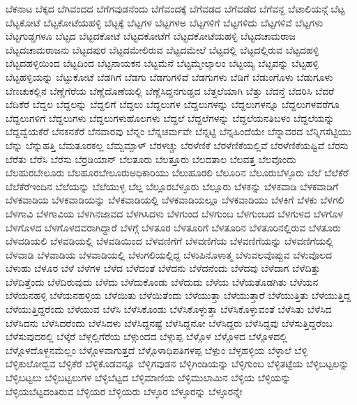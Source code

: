 {ಬೆಕನಾಟ
ಬೆಕ್ಕದ
ಬೆಗಿವಂದದ
ಬೆಗೆಗವುಡನೆಂದು
ಬೆಗೆವಂದಕ್ಕೆ
ಬೆಗೆವಡದ
ಬೆಗೆವಡೆದ
ಬೆಗೆವನ್ದ
ಬೆಟಾಲಿಯನ್ಗೆ
ಬೆಟ್ಟ
ಬೆಟ್ಟಕೋಟೆ
ಬೆಟ್ಟಕೋಟೆಯಹಳ್ಳಿ
ಬೆಟ್ಟಕ್ಕೆ
ಬೆಟ್ಟಗಳ
ಬೆಟ್ಟಗಳಅ
ಬೆಟ್ಟಗಳಿಗೆ
ಬೆಟ್ಟಗಳಿದು
ಬೆಟ್ಟಗಳಿವೆ
ಬೆಟ್ಟಗಳು
ಬೆಟ್ಟಗುಡ್ಡಗಳೂ
ಬೆಟ್ಟದ
ಬೆಟ್ಟದಕೋಟೆ
ಬೆಟ್ಟದಕೋಟೆಗೆ
ಬೆಟ್ಟದಕೋಟೆಯಹಳ್ಳಿ
ಬೆಟ್ಟದಚಾಮರಾಜ
ಬೆಟ್ಟದಚಾಮರಾಜನು
ಬೆಟ್ಟದಪುರ
ಬೆಟ್ಟದಮೇಲಿರುವ
ಬೆಟ್ಟದಮೇಲೆ
ಬೆಟ್ಟದಲ್ಲಿ
ಬೆಟ್ಟದಲ್ಲಿರುವ
ಬೆಟ್ಟದಹಳ್ಳಿ
ಬೆಟ್ಟದಹಳ್ಳಿಯಿಂದ
ಬೆಟ್ಟದಿಂದ
ಬೆಟ್ಟನಾಯಕನ
ಬೆಟ್ಟಮೆನೆ
ಬೆಟ್ಟಮ್ಮೇಲ್ಕಾಲಂ
ಬೆಟ್ಟಯ್ಯ
ಬೆಟ್ಟವನ್ನು
ಬೆಟ್ಟಹಳ್ಳಿ
ಬೆಟ್ಟಹಳ್ಳಿಯನ್ನು
ಬೆಟ್ಟುಕೋಟೆ
ಬೆಡಗಿಗೆ
ಬೆಡಗು
ಬೆಡಗುಗಳಿವೆ
ಬೆಡಗುಗಳು
ಬೆಡಿಗೆ
ಬೆಡುಂಗೊಳು
ಬೆಡುಗೂಳು
ಬೆಣಚುಕಲ್ಲಿನ
ಬೆಣ್ಣೆಗೆರೆಯ
ಬೆಣ್ಣೆದೊಣೆಯಲ್ಲಿ
ಬೆಣ್ಣೆಸಿದ್ದನಗುಡ್ಡದ
ಬೆತ್ತಲೆಯಾಗಿ
ಬೆತ್ತು
ಬೆದನ್ತೆ
ಬೆದರಿಸಿ
ಬೆದರೆ
ಬೆದಿಕೆರೆ
ಬೆದ್ದಲ
ಬೆದ್ದಲನ್ನು
ಬೆದ್ದಲಿಗೆ
ಬೆದ್ದಲು
ಬೆದ್ದಲುಗಳ
ಬೆದ್ದಲುಗಳನ್ನು
ಬೆದ್ದಲುಗಳನ್ನೂ
ಬೆದ್ದಲುಗಳವರೆಗೂ
ಬೆದ್ದಲುಗಳಿಗೆ
ಬೆದ್ದಲುಗಳು
ಬೆದ್ದಲುಗಳುಹೊಲಗಳು
ಬೆದ್ದಲೆ
ಬೆದ್ದಲೆಗಳನ್ನು
ಬೆದ್ದಲೆಯನತಿಬಳಂ
ಬೆದ್ದಲೆಯನ್ನು
ಬೆದ್ದವ್ವೆಯಕೆರೆ
ಬೆನಕನಕೆರೆ
ಬೆನವಾರವು
ಬೆನ್ನಂ
ಬೆನ್ನಚರ್ಮವೇ
ಬೆನ್ನಟ್ಟಿ
ಬೆನ್ನಹಿಂದೆಯೇ
ಬೆನ್ನಾವರದ
ಬೆನ್ನಿಗಸೆಟ್ಟಿಯು
ಬೆನ್ನು
ಬೆನ್ನುಹತ್ತಿ
ಬೆಮತೂರಕಲ್ಲ
ಬೆಮ್ಬಮ್ಪಾಳ್
ಬೆರಳಚ್ಚು
ಬೆರಳೆಣಿಕೆ
ಬೆರಳೆಣಿಕೆಯಲ್ಲಿವೆ
ಬೆರಳೆಣಿಕೆಯಷ್ಟಿವೆ
ಬೆರಸು
ಬೆರೆತು
ಬೆರೆಸಿ
ಬೆರೆಸು
ಬೆರ್ರಡಿಯಾನ್
ಬೆಲತೂರು
ಬೆಲತ್ತೂರು
ಬೆಲದತಾಲ
ಬೆಲವತ್ತ
ಬೆಲವೊಂದು
ಬೆಲಹುರಬೇಲೂರು
ಬೆಲಹೂರಬೇಲೂರುಅಧಿಕಾರಿಯು
ಬೆಲುಹೂರಲಿ
ಬೆಲೂರಿನ
ಬೆಲೂರುಬೆಳ್ಳೂರು
ಬೆಲೆ
ಬೆಲೆಕೆರೆ
ಬೆಲೆಕೆರೆಇಂದಿನ
ಬೆಲೆಯನ್ನು
ಬೆಲೆಯುಳ್ಳ
ಬೆಲ್ಲ
ಬೆಲ್ಲೂರಬೆಳ್ಳೂರು
ಬೆಲ್ಲೂರು
ಬೆಳಕನ್ನು
ಬೆಳಕವಾಡಿ
ಬೆಳಕವಾಡಿಗೆ
ಬೆಳಕವಾಡಿಯ
ಬೆಳಕವಾಡಿಯನ್ನು
ಬೆಳಕವಾಡಿಯಲ್ಲಿ
ಬೆಳಕವಾಡಿಯಲ್ಲೂ
ಬೆಳಕವಾಡಿಯು
ಬೆಳಕಿಗೆ
ಬೆಳಕು
ಬೆಳಗಲಿ
ಬೆಳಗಾವಿ
ಬೆಳಗಾವಿಯ
ಬೆಳಗಿನಜಾವದ
ಬೆಳಗಿಸಿದಳು
ಬೆಳಗುಂದ
ಬೆಳಗುಂಬ
ಬೆಳಗುಂಬದ
ಬೆಳಗುಳದ
ಬೆಳಗೊಳ
ಬೆಳಗೊಳದ
ಬೆಳಗೊಳದವರಾಗಿದ್ದಾರೆ
ಬೆಳಗ್ಗೆ
ಬೆಳತೂರ
ಬೆಳತೂರಿಗೆ
ಬೆಳತೂರಿನ
ಬೆಳತೂರಿನಲ್ಲಿರುವ
ಬೆಳತೂರು
ಬೆಳವಡಿಯಲಿ
ಬೆಳವಡಿಯಲ್ಲಿ
ಬೆಳವಡಿಯಿಂದ
ಬೆಳವಣಿಗೆಗೆ
ಬೆಳವಣಿಗೆಯ
ಬೆಳವಣಿಗೆಯನ್ನು
ಬೆಳವಣಿಗೆಯಲ್ಲಿ
ಬೆಳವಾಡಿ
ಬೆಳವಾಡಿಯ
ಬೆಳವಾಡಿಯಲ್ಲಿ
ಬೆಳುಗಲಿಯಲ್ಲಿದ್ದ
ಬೆಳುಪಿನೊಳಾತ್ಮ
ಬೆಳುವಲವೊಪ್ಪುವ
ಬೆಳುವೊಲದ
ಬೆಳುಹು
ಬೆಳೂರ
ಬೆಳೆ
ಬೆಳೆಗಳ
ಬೆಳೆದ
ಬೆಳೆದಂತೆ
ಬೆಳೆದನು
ಬೆಳೆದನೆಂದು
ಬೆಳೆದವು
ಬೆಳೆದಾಗ
ಬೆಳೆದಿತ್ತು
ಬೆಳೆದಿತ್ತೆಂದು
ಬೆಳೆದಿರುವುದು
ಬೆಳೆದು
ಬೆಳೆದುಕೊಂಡು
ಬೆಳೆದುದು
ಬೆಳೆಯ
ಬೆಳೆಯತೊಡಗಿತು
ಬೆಳೆಯನ
ಬೆಳೆಯನಹಳ್ಳಿ
ಬೆಳೆಯನಹಳ್ಳಿಯ
ಬೆಳೆಯಿತು
ಬೆಳೆಯಿತೆಂದು
ಬೆಳೆಯುತ್ತಾ
ಬೆಳೆಯುತ್ತಾರೆ
ಬೆಳೆಯುತ್ತಿತು
ಬೆಳೆಯುತ್ತಿದ್ದ
ಬೆಳೆಯುತ್ತಿದ್ದರೆಂದು
ಬೆಳೆಯುವ
ಬೆಳೆಸಿ
ಬೆಳೆಸಿಕೊಂಡು
ಬೆಳೆಸಿಕೊಳ್ಳುತ್ತಾ
ಬೆಳೆಸಿಕೊಳ್ಳುವಂತೆ
ಬೆಳೆಸಿತು
ಬೆಳೆಸಿದ
ಬೆಳೆಸಿದನು
ಬೆಳೆಸಿದರೆಂದು
ಬೆಳೆಸಿದಳು
ಬೆಳೆಸಿದ್ದನಷ್ಟೆ
ಬೆಳೆಸಿದ್ದನೋ
ಬೆಳೆಸಿದ್ದರು
ಬೆಳೆಸಿದ್ದವು
ಬೆಳೆಸುತ್ತಿದ್ದರೆಂಬ
ಬೆಳೆಸುವುದರಲ್ಲಿ
ಬೆಳ್ಕೆರೆ
ಬೆಳ್ಗಲ್ಲಿಗೆರೆಯ
ಬೆಳ್ಗುಂದದ
ಬೆಳ್ಗುಪ್ಪ
ಬೆಳ್ಗೊಳ
ಬೆಳ್ಗೊಳದ
ಬೆಳ್ಗೊಳದಲ್ಲಿ
ಬೆಳ್ಗೊಳದೊಳ್ಜನಮೆಲ್ಲಂ
ಬೆಳ್ಗೊಳವಾಗುತ್ತದೆ
ಬೆಳ್ಗೊಳಾಧಿಪತಿಗಳಪ್ಪ
ಬೆಳ್ಪುಂ
ಬೆಳ್ಳಹಳ್ಳಿಯ
ಬೆಳ್ಳಾಲೆ
ಬೆಳ್ಳಿ
ಬೆಳ್ಳಿಕುಲೋದ್ಭವ
ಬೆಳ್ಳಿಕೆರೆ
ಬೆಳ್ಳಿಕೊಡವನ್ನೂ
ಬೆಳ್ಳಿಗವುಡನ
ಬೆಳ್ಳಿಗಿಂಡಿಯನ್ನು
ಬೆಳ್ಳಿಗುಂಬ
ಬೆಳ್ಳಿತಟ್ಟೆಯ
ಬೆಳ್ಳಿಬಟ್ಟಲನ್ನು
ಬೆಳ್ಳಿಬಟ್ಟಲು
ಬೆಳ್ಳಿಬಟ್ಟಲುಗಳ
ಬೆಳ್ಳಿಬೆಟ್ಟದ
ಬೆಳ್ಳಿಮಾಣಿಯ
ಬೆಳ್ಳಿಮುಲಾಮಿನ
ಬೆಳ್ಳಿಯ
ಬೆಳ್ಳಿಯನ್ನು
ಬೆಳ್ಳಿಯಬೆಟ್ಟದಂತಿರುವ
ಬೆಳ್ಳಿಯರ
ಬೆಳ್ಳಿಯರು
ಬೆಳ್ಳೂರ
ಬೆಳ್ಳೂರನ್ನು
ಬೆಳ್ಳೂರನ್ನೇ
}
